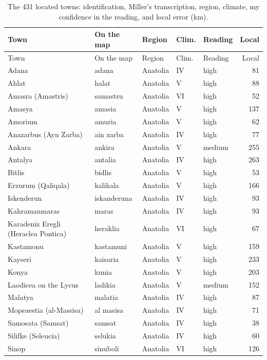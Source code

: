 \documentclass[11pt,a4paper]{article}
\begin{document}
{\footnotesize\setlength{\tabcolsep}{4pt}\begin{longtable}{p{4.6cm}p{3.0cm}p{3.6cm}llr}\caption{The 431 located towns: identification, Miller's transcription, region, climate, my confidence in the reading, and local error (km).}\label{tab:located}\\\toprule Town & On the map & Region & Clim. & Reading & Local\\\midrule\endfirsthead\toprule Town & On the map & Region & Clim. & Reading & Local\\\midrule\endhead
Adana & adana & Anatolia & IV & high & 81\\
Ahlat & halat & Anatolia & V & high & 88\\
Amasra (Amastris) & samastru & Anatolia & VI & high & 52\\
Amasya & amasia & Anatolia & V & high & 137\\
Amorium & amuria & Anatolia & V & high & 62\\
Anazarbus (Ayn Zarba) & ain zarba & Anatolia & IV & high & 77\\
Ankara & ankira & Anatolia & V & medium & 255\\
Antalya & antalia & Anatolia & IV & high & 263\\
Bitlis & bidlis & Anatolia & V & high & 53\\
Erzurum (Qaliqala) & kalikala & Anatolia & V & high & 166\\
Iskenderun & iskanderuna & Anatolia & IV & high & 93\\
Kahramanmaras & maras & Anatolia & IV & high & 93\\
Karadeniz Eregli (Heraclea Pontica) & heraklia & Anatolia & VI & high & 67\\
Kastamonu & kastamuni & Anatolia & V & high & 159\\
Kayseri & kaisaria & Anatolia & V & high & 233\\
Konya & kunia & Anatolia & V & high & 203\\
Laodicea on the Lycus & ladikia & Anatolia & V & medium & 152\\
Malatya & malatia & Anatolia & IV & high & 87\\
Mopsuestia (al-Massisa) & al masisa & Anatolia & IV & high & 71\\
Samosata (Samsat) & samsat & Anatolia & IV & high & 38\\
Silifke (Seleucia) & selukia & Anatolia & IV & high & 60\\
Sinop & sinuboli & Anatolia & VI & high & 126\\

\end{longtable}}
\end{document}
